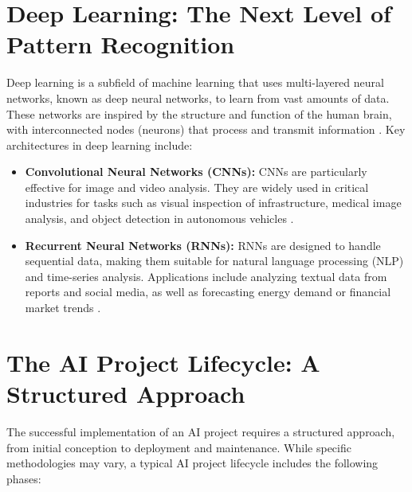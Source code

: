 \section{Deep Learning: The Next Level of Pattern Recognition}
\label{sec:deep_learning}
Deep learning is a subfield of machine learning that uses multi-layered neural networks, known as deep neural networks, to learn from vast amounts of data. These networks are inspired by the structure and function of the human brain, with interconnected nodes (neurons) that process and transmit information \parencite{LeCun2015}. Key architectures in deep learning include:

\begin{itemize}
    \item \textbf{Convolutional Neural Networks (CNNs):} CNNs are particularly effective for image and video analysis. They are widely used in critical industries for tasks such as visual inspection of infrastructure, medical image analysis, and object detection in autonomous vehicles \parencite{Krizhevsky2012}.
    \item \textbf{Recurrent Neural Networks (RNNs):} RNNs are designed to handle sequential data, making them suitable for natural language processing (NLP) and time-series analysis. Applications include analyzing textual data from reports and social media, as well as forecasting energy demand or financial market trends \parencite{Hochreiter1997}.
\end{itemize}

\section{The AI Project Lifecycle: A Structured Approach}
\label{sec:ai_project_lifecycle}
The successful implementation of an AI project requires a structured approach, from initial conception to deployment and maintenance. While specific methodologies may vary, a typical AI project lifecycle includes the following phases:

